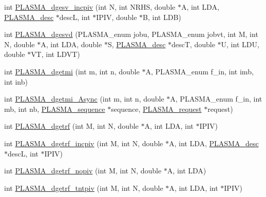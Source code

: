 \begin{DoxyCompactItemize}
\item 
int \hyperlink{group__double_gaaf143240840f5315cf672d66dead1111_gaaf143240840f5315cf672d66dead1111}{P\+L\+A\+S\+M\+A\+\_\+dgesv\+\_\+incpiv} (int N, int N\+R\+H\+S, double $\ast$A, int L\+D\+A, \hyperlink{structplasma__desc__t}{P\+L\+A\+S\+M\+A\+\_\+desc} $\ast$desc\+L, int $\ast$I\+P\+I\+V, double $\ast$B, int L\+D\+B)
\item 
int \hyperlink{group__double_ga02d390fe38b9b983a604f2a8557abafa_ga02d390fe38b9b983a604f2a8557abafa}{P\+L\+A\+S\+M\+A\+\_\+dgesvd} (P\+L\+A\+S\+M\+A\+\_\+enum jobu, P\+L\+A\+S\+M\+A\+\_\+enum jobvt, int M, int N, double $\ast$A, int L\+D\+A, double $\ast$S, \hyperlink{structplasma__desc__t}{P\+L\+A\+S\+M\+A\+\_\+desc} $\ast$desc\+T, double $\ast$U, int L\+D\+U, double $\ast$V\+T, int L\+D\+V\+T)
\item 
int \hyperlink{group__double_gabac2c0fcf8998d6f85dd0e9a698d97e7_gabac2c0fcf8998d6f85dd0e9a698d97e7}{P\+L\+A\+S\+M\+A\+\_\+dgetmi} (int m, int n, double $\ast$A, P\+L\+A\+S\+M\+A\+\_\+enum f\+\_\+in, int imb, int inb)
\item 
int \hyperlink{group__double_gac70f543ebddfb700a3baa45f17d38ab7_gac70f543ebddfb700a3baa45f17d38ab7}{P\+L\+A\+S\+M\+A\+\_\+dgetmi\+\_\+\+Async} (int m, int n, double $\ast$A, P\+L\+A\+S\+M\+A\+\_\+enum f\+\_\+in, int mb, int nb, \hyperlink{structplasma__sequence__t}{P\+L\+A\+S\+M\+A\+\_\+sequence} $\ast$sequence, \hyperlink{structplasma__request__t}{P\+L\+A\+S\+M\+A\+\_\+request} $\ast$request)
\item 
int \hyperlink{group__double_gaa626e37ec710bfb5c98fef7b00511ea8_gaa626e37ec710bfb5c98fef7b00511ea8}{P\+L\+A\+S\+M\+A\+\_\+dgetrf} (int M, int N, double $\ast$A, int L\+D\+A, int $\ast$I\+P\+I\+V)
\item 
int \hyperlink{group__double_gad1a9ffdf2bf95696d94eac58177c3964_gad1a9ffdf2bf95696d94eac58177c3964}{P\+L\+A\+S\+M\+A\+\_\+dgetrf\+\_\+incpiv} (int M, int N, double $\ast$A, int L\+D\+A, \hyperlink{structplasma__desc__t}{P\+L\+A\+S\+M\+A\+\_\+desc} $\ast$desc\+L, int $\ast$I\+P\+I\+V)
\item 
int \hyperlink{group__double_ga8a7ad8ad13ca055f1cece944ffa8185a_ga8a7ad8ad13ca055f1cece944ffa8185a}{P\+L\+A\+S\+M\+A\+\_\+dgetrf\+\_\+nopiv} (int M, int N, double $\ast$A, int L\+D\+A)
\item 
int \hyperlink{group__double_gac5e965a28bb5189491690e9cdfcc2b61_gac5e965a28bb5189491690e9cdfcc2b61}{P\+L\+A\+S\+M\+A\+\_\+dgetrf\+\_\+tntpiv} (int M, int N, double $\ast$A, int L\+D\+A, int $\ast$I\+P\+I\+V)
\item 

\end{DoxyCompactItemize}
